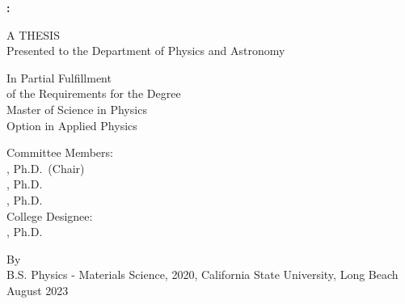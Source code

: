 \clearpage

\begin{titlepage}
    \begin{center}
  
        \MakeUppercase{ \textbf{ \ttitle: \subttitle } }
      \vfill
        
A THESIS \\  \medskip
Presented to the Department of Physics and Astronomy \\ \medskip
\univname
        
        \vspace{2.8cm}
        
        In Partial Fulfillment\\
        \medskip
        of the Requirements for the Degree\\
        \medskip
        Master of Science in Physics\\
        \medskip
        Option in Applied Physics
        
        \vfill
        
        Committee Members:\\
        \medskip
        \advisorname, Ph.D.~(Chair)\\
        \memberonename, Ph.D.\\
        \membertwoname, Ph.D.\\
        \bigskip
        College Designee:\\
        \medskip
        \deptchairname, Ph.D.
        
        \vfill
        
        By \authorname \\
        \medskip
        B.S. Physics - Materials Science, 2020, California State University, Long Beach\\
        \medskip
		August 2023
		
        
    \end{center}


\end{titlepage}

